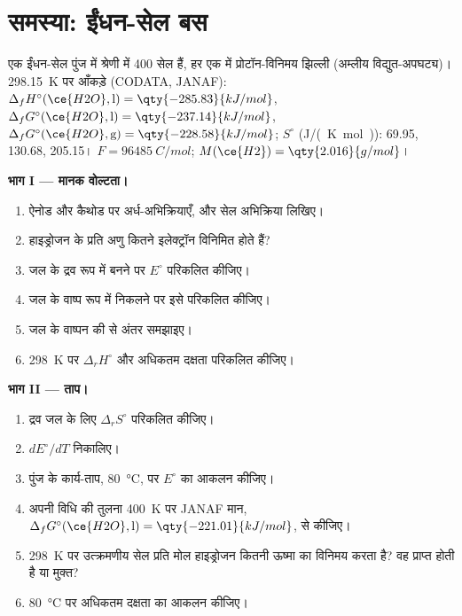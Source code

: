 \section{समस्या: ईंधन-सेल बस}

\begin{problem}
\label{pb:b2:cell-thermodynamics:1}
एक ईंधन-सेल पुंज में श्रेणी में 400 सेल हैं, हर एक में प्रोटॉन-विनिमय
झिल्ली (अम्लीय विद्युत-अपघट्य)। \qty{298.15}{K} पर आँकड़े (CODATA, JANAF):
$\Delta_f H^\circ(\ce{H2O}, \text{l}) = \qty{-285.83}{kJ/mol}$, $\Delta_f
G^\circ(\ce{H2O}, \text{l}) = \qty{-237.14}{kJ/mol}$, $\Delta_f G^\circ(\ce{H2O},
\text{g}) = \qty{-228.58}{kJ/mol}$; $S^\circ$ (\unit{J/(K.mol)}):  69.95,
 130.68,  205.15। $F = \qty{96485}{C/mol}$; $M(\ce{H2}) =
\qty{2.016}{g/mol}$।

\medskip
\noindent\textbf{भाग I --- मानक वोल्टता।}
\begin{enumerate}
  \item ऐनोड और कैथोड पर अर्ध-अभिक्रियाएँ, और सेल
        अभिक्रिया लिखिए।
  \item हाइड्रोजन के प्रति अणु कितने इलेक्ट्रॉन विनिमित होते हैं?
  \item जल के द्रव रूप में बनने पर $E^\circ$ परिकलित कीजिए।
  \item जल के वाष्प रूप में निकलने पर इसे परिकलित कीजिए।
  \item जल के वाष्पन की  से अंतर समझाइए।
  \item \qty{298}{K} पर $\Delta_r H^\circ$ और अधिकतम दक्षता परिकलित कीजिए।
\end{enumerate}

\medskip
\noindent\textbf{भाग II --- ताप।}
\begin{enumerate}[resume]
  \item द्रव जल के लिए $\Delta_r S^\circ$ परिकलित कीजिए।
  \item $dE^\circ/dT$ निकालिए।
  \item पुंज के कार्य-ताप, \qty{80}{\degreeCelsius}, पर $E^\circ$ का
        आकलन कीजिए।
  \item अपनी विधि की तुलना \qty{400}{K} पर JANAF मान, $\Delta_f
        G^\circ(\ce{H2O}, \text{l}) = \qty{-221.01}{kJ/mol}$, से कीजिए।
  \item \qty{298}{K} पर उत्क्रमणीय सेल प्रति मोल हाइड्रोजन कितनी ऊष्मा का विनिमय करता है?
        वह प्राप्त होती है या मुक्त?
  \item \qty{80}{\degreeCelsius} पर अधिकतम दक्षता का आकलन कीजिए।
\end{enumerate}


\end{problem}
